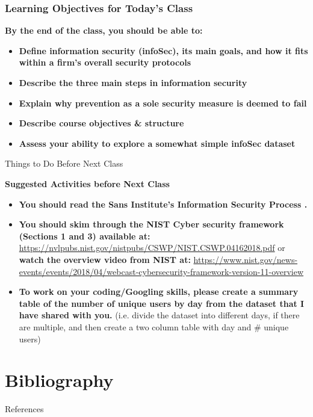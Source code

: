 \documentclass[aspectratio=169]{beamer} %
\begin{document}
\begin{frame}
	\frametitle{\textbf{Learning Objectives for Today's Class}}
	\begin{block}{\textbf{By the end of the class, you should be able to:}}
		\begin{itemize}
			\item \textbf{Define information security (infoSec), its main goals, and how it fits within a firm's overall security protocols}
			\item \textbf{Describe the three main steps in information security}
			\item \textbf{Explain why prevention as a sole security measure is deemed to fail}
			\item \textbf{Describe course objectives \& structure}
			\item \textbf{Assess your ability to explore a somewhat simple infoSec dataset}
		\end{itemize}
	\end{block}
\end{frame}

\begin{frame}{Things to Do Before Next Class}
	\begin{block}{\textbf{Suggested Activities before Next Class}}
		\begin{itemize}
			\item \textbf{You should read the Sans Institute's Information Security Process \cite{sans2002info}.}
			\item \textbf{You should skim through the NIST Cyber security framework (Sections 1 and 3) available at:} \url{https://nvlpubs.nist.gov/nistpubs/CSWP/NIST.CSWP.04162018.pdf} or \textbf{watch the overview video from NIST at:} \url{https://www.nist.gov/news-events/events/2018/04/webcast-cybersecurity-framework-version-11-overview}
			\item \textbf{To work on your coding/Googling skills, please create a summary table of the number of unique users by day from the dataset that I have shared with you.} (i.e. divide the dataset into different days, if there are multiple, and then create a two column table with day and \# unique users)
		\end{itemize}
	\end{block}
\end{frame}

\section*{Bibliography}
\begin{frame}[allowframebreaks]{References}%
	\tiny{
		
		
	}
\end{frame}


\maketitle
\end{document}
